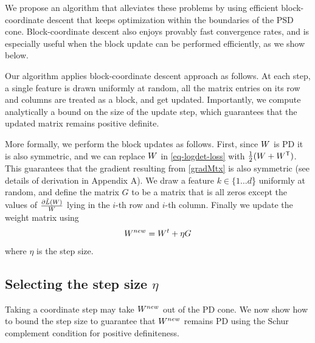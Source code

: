 \documentclass{article}
\begin{document}
We propose an algorithm that alleviates these problems by using efficient block-coordinate descent that keeps optimization within the boundaries of the PSD cone.
Block-coordinate descent also enjoys provably fast convergence rates, and is especially useful when the block update can be performed efficiently, as we show below.

Our algorithm applies block-coordinate descent approach as follows.
At each step, a single feature is drawn uniformly at random, all the matrix entries on its row and columns are treated as a block, and get updated. Importantly, we compute analytically a bound on the size of the update step, which guarantees that the updated matrix remains positive definite.

More formally, we perform the block updates as follows. First, since ${W}$ is PD it is also symmetric, and we can replace ${W}$ in \eqref{eq-logdet-loss} with $\tfrac{1}{2}({W} + {W}{}^\mathsf{T})$.  This guarantees that the gradient resulting from \eqref{gradMtx} is also symmetric (see details of derivation in Appendix A). We draw a feature $k \in \{1 \ldots d$\} uniformly at random, and define the matrix $G$ to be a matrix that is all zeros except the values of $\frac{\partial \tilde{L}({W})}{{W}}$ lying in the $i$-th row and $i$-th column. Finally we update the weight matrix using 
\begin{equation}
    {{W^{new}}} = {W}^t +\eta G
\label{updateEq}
\end{equation}
where $\eta$ is the step size.

\subsection{Selecting the step size $\eta$}\label{subsec:step}
Taking a coordinate step may take ${{W^{new}}}$ out of the PD cone. We now show how to bound the step size to guarantee that ${{W^{new}}}$ remains PD using the Schur complement condition for positive definiteness.
\end{document}

